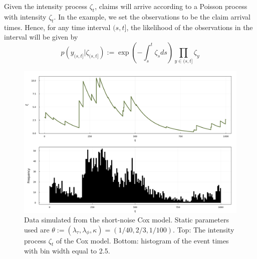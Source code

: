 \documentclass[12pt,a4paper]{article}
\begin{document}
Given the intensity process \(\zeta_t\), claims will arrive according to a Poisson process with intensity \(\zeta_t\). In the example, we set the observations to be the claim arrival times. Hence, for any time interval \((s,t]\), the likelihood of the observations in the interval will be given by 
\[
  p(y_{(s,t]}|\zeta_{(s,t]}) := \exp \left(-\int_{s}^{t} \zeta_s ds\right) \prod_{y \in (s,t]} \zeta_y 
\]
\begin{figure}[htb!]
    \centering
    \includegraphics[width=\textwidth]{SNC_Data.pdf}
    \caption{Data simulated from the short-noise Cox model. Static parameters used are \(\theta:=(\lambda_\tau,\lambda_\phi,\kappa)= (1/40,2/3,1/100)\). Top: The intensity process \(\zeta_t\) of the Cox model. Bottom: histogram of the event times with bin width equal to 2.5.}
    \label{Figure: SNC Data}
\end{figure}
\end{document}
